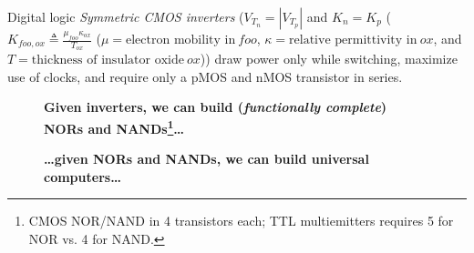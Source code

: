 \documentclass[mathserif,xcolor={dvipsnames,table}]{beamer}
\begin{document}
\begin{frame}{Digital logic}
\tiny{\textit{Symmetric CMOS inverters} ($V_{T_{n}} = |V_{T_{p}}|$ and
$K_n = K_p$ ($K_{foo,ox}\triangleq \frac{\mu_{foo}\kappa_{ox}}{T_{ox}}$
($\mu = \text{electron mobility in}\ foo$,
$\kappa = \text{relative permittivity in}\ ox$,
and $T = \text{thickness of insulator oxide}\ ox$))
draw power only while switching, maximize use of clocks, and require only 
a pMOS and nMOS transistor in series.}
\begin{figure}
\begin{center}
\end{center}
\tiny{\textbf{Given inverters, we can build (\textit{functionally complete}) NORs and NANDs\footnote{\tiny{CMOS NOR/NAND in 4 transistors each; TTL multiemitters requires 5 for NOR vs. 4 for NAND.}}\ldots}}
\end{figure}
\begin{figure}
\begin{center}
\end{center}
\tiny{\textbf{\ldots given NORs and NANDs, we can build universal computers\ldots}}
\end{figure}


\end{frame}
\end{document}
